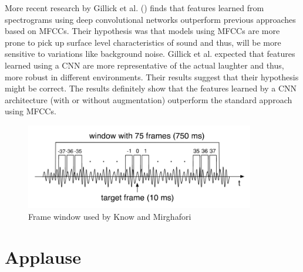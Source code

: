 \documentclass[bsc,frontabs,parskip,deptreport]{infthesis}
\begin{document}
More recent research by Gillick et al. (\cite{gillick2021robust}) finds that features learned from spectrograms using deep convolutional networks outperform previous approaches based on MFCCs. Their hypothesis was that models using MFCCs are more prone to pick up surface level characteristics of sound and thus, will be more sensitive to variations like background noise. Gillick et al. expected that features learned using a CNN are more representative of the actual laughter and thus, more robust in different environments. 
Their results suggest that their hypothesis might be correct. The results definitely show that the features learned by a CNN architecture (with or without augmentation) outperform the standard approach using MFCCs. 

\begin{figure}[htp]
    \centering
    \includegraphics[width=10cm]{imgs/Knox_window.png}
    \caption{Frame window used by Know and Mirghafori}
    \label{fig:know_window}
\end{figure}

\section{Applause}





%
%
%
\end{document}
